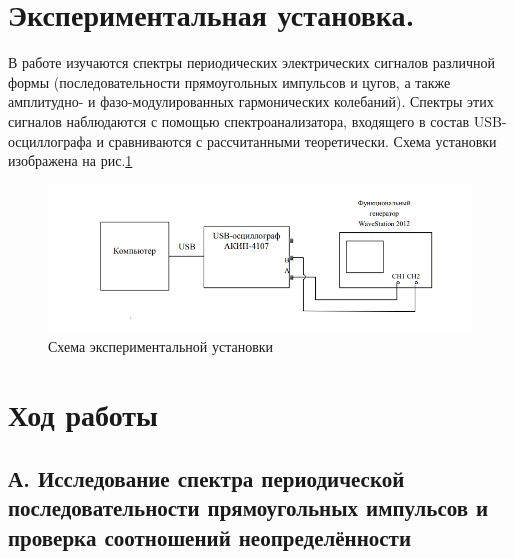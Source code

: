 \documentclass[a4paper,12pt]{article} %
\begin{document}
\newpage

\section{Экспериментальная установка.}
В работе изучаются спектры периодических электрических сигналов 
различной формы (последовательности прямоугольных импульсов и цугов, 
а также амплитудно- и фазо-модулированных гармонических колебаний). 
Спектры этих сигналов наблюдаются с помощью спектроанализатора, входящего в состав USB-осциллографа и сравниваются с рассчитанными теоретически. Схема установки изображена на рис.\ref{ustanovka}
\begin{figure}[h]
    \centering
    \includegraphics{data/ustanovka.png}
    \caption{Схема экспериментальной установки}
    \label{ustanovka}
\end{figure}


\newpage
\section{Ход работы}

\subsection*{А. Исследование спектра периодической последовательности
прямоугольных импульсов и проверка соотношений неопределённости}
\end{document}
